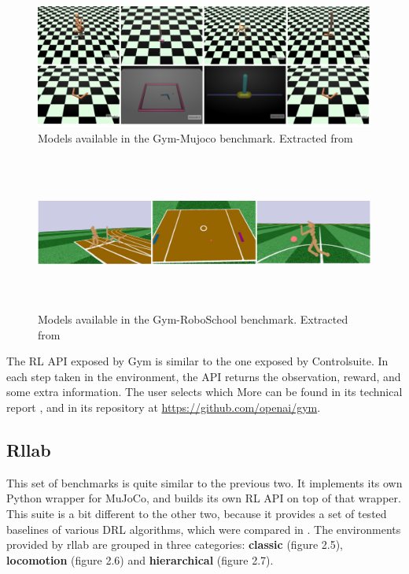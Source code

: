     \begin{figure}[!ht]
        \centering
        \includegraphics[width=5.5in]{./chapters/imgs/img_openai_gym_mujoco_envs.png}
        \caption[Gym Mujoco models]{Models available in the Gym-Mujoco benchmark. Extracted from \citet{Gym}}
        \label{fig:gym-mujoco-envs}
    \end{figure}

    \begin{figure}[!ht]
        \centering
        \includegraphics[width=6.0in,height=2.0in]{./chapters/imgs/img_openai_gym_roboschool_envs.png}
        \caption[Gym RoboSchool models]{Models available in the Gym-RoboSchool benchmark. Extracted from \citet{Gym}}
        \label{fig:gym-roboschool-envs}
    \end{figure}

    The RL API exposed by Gym is similar to the one exposed by Controlsuite. In each step taken in the environment, the API
    returns the observation, reward, and some extra information. The user selects which More can be found in its technical report \citep{Gym}, and
    in its repository at \url{https://github.com/openai/gym}.

    \subsection{Rllab}
    This set of benchmarks is quite similar to the previous two. It implements its own Python wrapper for MuJoCo, and 
    builds its own RL API on top of that wrapper. This suite is a bit different to the other two, because it provides
    a set of tested baselines of various DRL algorithms, which were compared in \cite{Rllab}. The environments provided 
    by rllab are grouped in three categories: \textbf{classic} (figure 2.5), \textbf{locomotion} (figure 2.6) and 
    \textbf{hierarchical} (figure 2.7).

